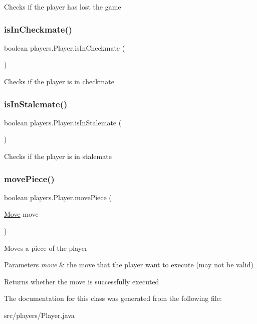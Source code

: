Checks if the player has lost the game \mbox{\label{classplayers_1_1_player_a5dc5f954097bc57cb2b1a63e1d32d00e}} 
\subsubsection{\texorpdfstring{is\+In\+Checkmate()}{isInCheckmate()}}
{\footnotesize\ttfamily boolean players.\+Player.\+is\+In\+Checkmate (\begin{DoxyParamCaption}{ }\end{DoxyParamCaption})}

Checks if the player is in checkmate \mbox{\label{classplayers_1_1_player_ad7d20950f08db802354df71058addc8f}} 
\subsubsection{\texorpdfstring{is\+In\+Stalemate()}{isInStalemate()}}
{\footnotesize\ttfamily boolean players.\+Player.\+is\+In\+Stalemate (\begin{DoxyParamCaption}{ }\end{DoxyParamCaption})}

Checks if the player is in stalemate \mbox{\label{classplayers_1_1_player_ad9049a1cec91bf5214100286f984cdaa}} 
\subsubsection{\texorpdfstring{move\+Piece()}{movePiece()}}
{\footnotesize\ttfamily boolean players.\+Player.\+move\+Piece (\begin{DoxyParamCaption}\item[{\mbox{\hyperlink{classpieces_1_1_move}{Move}}}]{move }\end{DoxyParamCaption})}

Moves a piece of the player 
\begin{DoxyParams}{Parameters}
{\em move} & the move that the player want to execute (may not be valid) \\
\hline
\end{DoxyParams}
\begin{DoxyReturn}{Returns}
whether the move is successfully executed 
\end{DoxyReturn}


The documentation for this class was generated from the following file\+:\begin{DoxyCompactItemize}
\item 
src/players/Player.\+java\end{DoxyCompactItemize}
